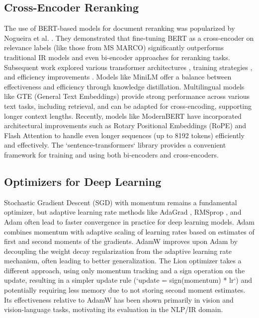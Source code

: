 \documentclass[conference]{IEEEtran}
\begin{document}
\subsection{Cross-Encoder Reranking}
The use of BERT-based models for document reranking was popularized by Nogueira et al. \cite{nogueira2019passage, Nogueira2020Document}. They demonstrated that fine-tuning BERT as a cross-encoder on relevance labels (like those from MS MARCO) significantly outperforms traditional IR models and even bi-encoder approaches for reranking tasks. Subsequent work explored various transformer architectures \cite{Lin2021PretrainedTF}, training strategies \cite{gao2021complementing}, and efficiency improvements \cite{hofstatter2020improving}. Models like MiniLM \cite{wang2020minilm} offer a balance between effectiveness and efficiency through knowledge distillation. Multilingual models like GTE \cite{li2023towards} (General Text Embeddings) provide strong performance across various text tasks, including retrieval, and can be adapted for cross-encoding, supporting longer context lengths. Recently, models like ModernBERT \cite{modernbert} have incorporated architectural improvements such as Rotary Positional Embeddings (RoPE) \cite{su2023roformerenhancedtransformerrotary} and Flash Attention \cite{dao2022flashattentionfastmemoryefficientexact} to handle even longer sequences (up to 8192 tokens) efficiently and effectively. The `sentence-transformers` library \cite{reimers2019sentence} provides a convenient framework for training and using both bi-encoders and cross-encoders.

\subsection{Optimizers for Deep Learning}
Stochastic Gradient Descent (SGD) with momentum remains a fundamental optimizer, but adaptive learning rate methods like AdaGrad \cite{duchi2011adaptive}, RMSprop \cite{tieleman2012lecture}, and Adam \cite{kingma2014adam} often lead to faster convergence in practice for deep learning models. Adam combines momentum with adaptive scaling of learning rates based on estimates of first and second moments of the gradients. AdamW \cite{loshchilov2019decoupled} improves upon Adam by decoupling the weight decay regularization from the adaptive learning rate mechanism, often leading to better generalization. The Lion optimizer \cite{chen2023symbolic} takes a different approach, using only momentum tracking and a sign operation on the update, resulting in a simpler update rule (`update = sign(momentum) * lr`) and potentially requiring less memory due to not storing second moment estimates. Its effectiveness relative to AdamW has been shown primarily in vision and vision-language tasks, motivating its evaluation in the NLP/IR domain.
\end{document}
